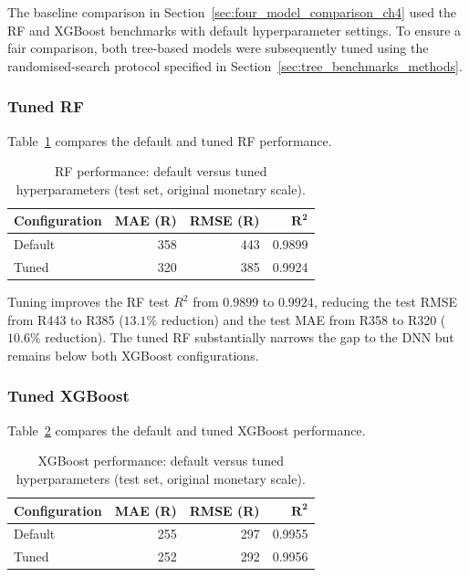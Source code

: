 The baseline comparison in
Section~\ref{sec:four_model_comparison_ch4} used the RF and
XGBoost benchmarks with default hyperparameter settings.  To
ensure a fair comparison, both tree-based models were subsequently tuned
using the randomised-search protocol specified in
Section~\ref{sec:tree_benchmarks_methods}.

\subsubsection{Tuned RF}

Table~\ref{tab:tuned_rf_ch4} compares the default and tuned RF
performance.

\begin{table}[H]
\centering
\small
\renewcommand{\arraystretch}{1.15}
\begin{tabular}{lrrr}
\toprule
\textbf{Configuration} & \textbf{MAE (R)} & \textbf{RMSE (R)} &
$\boldsymbol{R^2}$ \\
\midrule
Default & 358 & 443 & 0.9899 \\
Tuned   & 320 & 385 & 0.9924 \\
\bottomrule
\end{tabular}
\caption{RF performance: default versus tuned
hyperparameters (test set, original monetary scale).}
\label{tab:tuned_rf_ch4}
\end{table}

\noindent
Tuning improves the RF test $R^2$ from $0.9899$ to $0.9924$,
reducing the test RMSE from R443 to R385 ($13.1\%$ reduction) and
the test MAE from R358 to R320 ($10.6\%$ reduction).  The tuned
RF substantially narrows the gap to the DNN but remains
below both XGBoost configurations.

\subsubsection{Tuned XGBoost}

Table~\ref{tab:tuned_xgb_ch4} compares the default and tuned
XGBoost performance.

\begin{table}[H]
\centering
\small
\renewcommand{\arraystretch}{1.15}
\begin{tabular}{lrrr}
\toprule
\textbf{Configuration} & \textbf{MAE (R)} & \textbf{RMSE (R)} &
$\boldsymbol{R^2}$ \\
\midrule
Default & 255 & 297 & 0.9955 \\
Tuned   & 252 & 292 & 0.9956 \\
\bottomrule
\end{tabular}
\caption{XGBoost performance: default versus tuned hyperparameters
(test set, original monetary scale).}
\label{tab:tuned_xgb_ch4}
\end{table}

